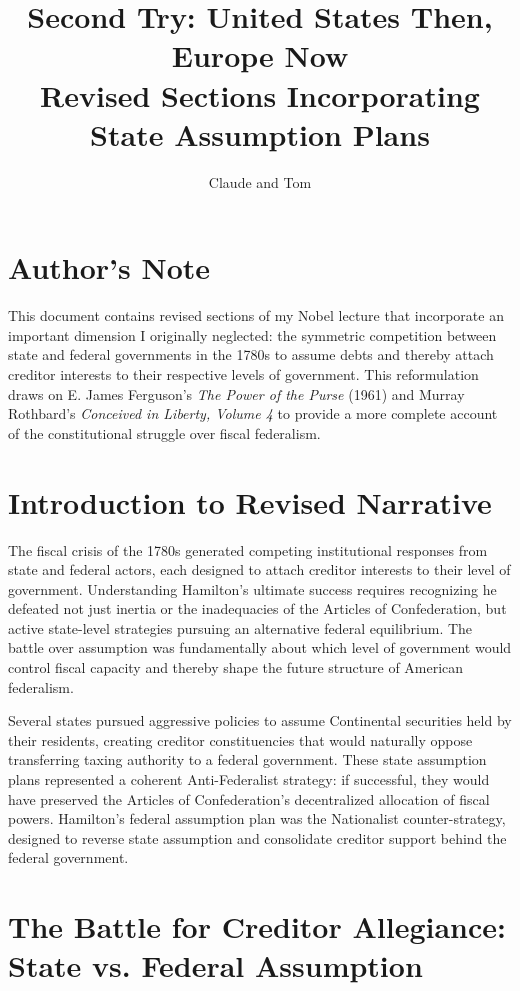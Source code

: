 \documentclass[12pt]{article}
\title{Second Try: United States Then, Europe Now\\
\large Revised Sections Incorporating State Assumption Plans}
\author{Claude and Tom}
\date{}
\begin{document}
\maketitle

\section*{Author's Note}

This document contains revised sections of my Nobel lecture that incorporate an important dimension I originally neglected: the symmetric competition between state and federal governments in the 1780s to assume debts and thereby attach creditor interests to their respective levels of government. This reformulation draws on E. James Ferguson's \textit{The Power of the Purse} (1961) and Murray Rothbard's \textit{Conceived in Liberty, Volume 4} to provide a more complete account of the constitutional struggle over fiscal federalism.

\section{Introduction to Revised Narrative}

The fiscal crisis of the 1780s generated competing institutional responses from state and federal actors, each designed to attach creditor interests to their level of government. Understanding Hamilton's ultimate success requires recognizing he defeated not just inertia or the inadequacies of the Articles of Confederation, but active state-level strategies pursuing an alternative federal equilibrium. The battle over assumption was fundamentally about which level of government would control fiscal capacity and thereby shape the future structure of American federalism.

Several states pursued aggressive policies to assume Continental securities held by their residents, creating creditor constituencies that would naturally oppose transferring taxing authority to a federal government. These state assumption plans represented a coherent Anti-Federalist strategy: if successful, they would have preserved the Articles of Confederation's decentralized allocation of fiscal powers. Hamilton's federal assumption plan was the Nationalist counter-strategy, designed to reverse state assumption and consolidate creditor support behind the federal government.

\section{The Battle for Creditor Allegiance: State vs. Federal Assumption}
\end{document}
